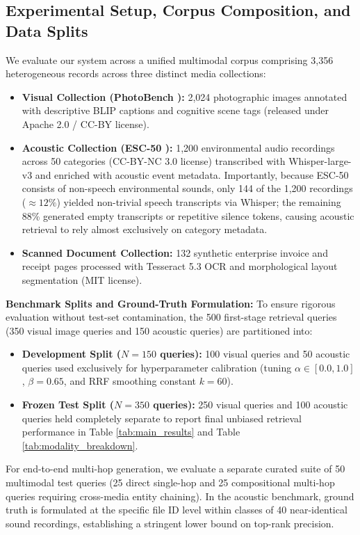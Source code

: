 \documentclass[conference]{IEEEtran}
\begin{document}
\subsection{Experimental Setup, Corpus Composition, and Data Splits}
We evaluate our system across a unified multimodal corpus comprising 3,356 heterogeneous records across three distinct media collections:
\begin{itemize}
    \item \textbf{Visual Collection (PhotoBench \cite{sun2024photobench}):} 2,024 photographic images annotated with descriptive BLIP captions \cite{li2022blip} and cognitive scene tags (released under Apache 2.0 / CC-BY license).
    \item \textbf{Acoustic Collection (ESC-50 \cite{piczak2015esc50}):} 1,200 environmental audio recordings across 50 categories (CC-BY-NC 3.0 license) transcribed with Whisper-large-v3 \cite{radford2023whisper} and enriched with acoustic event metadata. Importantly, because ESC-50 consists of non-speech environmental sounds, only 144 of the 1,200 recordings ($\approx 12\%$) yielded non-trivial speech transcripts via Whisper; the remaining 88\% generated empty transcripts or repetitive silence tokens, causing acoustic retrieval to rely almost exclusively on category metadata.
    \item \textbf{Scanned Document Collection:} 132 synthetic enterprise invoice and receipt pages processed with Tesseract 5.3 OCR \cite{smith2007tesseract} and morphological layout segmentation (MIT license).
\end{itemize}

\textbf{Benchmark Splits and Ground-Truth Formulation:}
To ensure rigorous evaluation without test-set contamination, the 500 first-stage retrieval queries (350 visual image queries and 150 acoustic queries) are partitioned into:
\begin{itemize}
    \item \textbf{Development Split ($N=150$ queries):} 100 visual queries and 50 acoustic queries used exclusively for hyperparameter calibration (tuning $\alpha \in [0.0, 1.0]$, $\beta = 0.65$, and RRF smoothing constant $k = 60$).
    \item \textbf{Frozen Test Split ($N=350$ queries):} 250 visual queries and 100 acoustic queries held completely separate to report final unbiased retrieval performance in Table \ref{tab:main_results} and Table \ref{tab:modality_breakdown}.
\end{itemize}
For end-to-end multi-hop generation, we evaluate a separate curated suite of 50 multimodal test queries (25 direct single-hop and 25 compositional multi-hop queries requiring cross-media entity chaining). In the acoustic benchmark, ground truth is formulated at the specific file ID level within classes of 40 near-identical sound recordings, establishing a stringent lower bound on top-rank precision.
\end{document}
